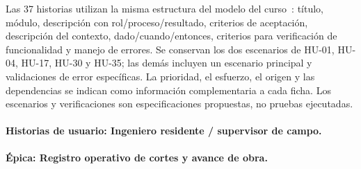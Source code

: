 \documentclass[12pt,letterpaper]{article}
\begin{document}
Las 37 historias utilizan la misma estructura del modelo del curso~\cite{garcia-formato-hu}: título, módulo, descripción con rol/proceso/resultado, criterios de aceptación, descripción del contexto, dado/cuando/entonces, criterios para verificación de funcionalidad y manejo de errores. Se conservan los dos escenarios de HU-01, HU-04, HU-17, HU-30 y HU-35; las demás incluyen un escenario principal y validaciones de error específicas. La prioridad, el esfuerzo, el origen y las dependencias se indican como información complementaria a cada ficha. Los escenarios y verificaciones son especificaciones propuestas, no pruebas ejecutadas.

\paragraph{Historias de usuario: Ingeniero residente / supervisor de campo.}\mbox{}\par
\textbf{Épica: Registro operativo de cortes y avance de obra.}\par
\end{document}
